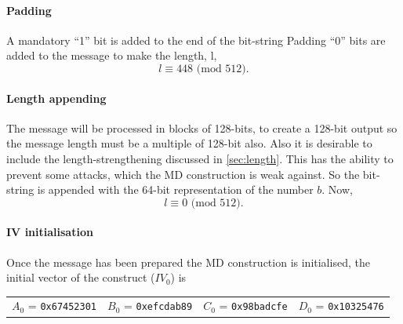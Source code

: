 \documentclass[a4paper,12pt]{article}
\begin{document}
\paragraph{Padding}
\label{sec:md5pad}
A mandatory ``1'' bit is added to the end of the bit-string 
Padding ``0'' bits are added to the message to make the length, l, $$l \equiv 448 \text{ (mod } 512).$$

\paragraph{Length appending}
The message will be processed in blocks of 128-bits, to create a 128-bit output so the message length must be a multiple of 128-bit also. Also it is desirable to include the length-strengthening discussed in \ref{sec:length}. This has the ability to prevent some attacks, which the MD construction is weak against. So the bit-string is appended with the 64-bit representation of the number $b$. Now, $$l \equiv 0 \text{ (mod } 512).$$

\paragraph{IV initialisation}
Once the message has been prepared the MD construction is initialised, the initial vector of the construct ($IV_0$) is

\begin{tabular}{ l l l l}
	$A_0$ = \texttt{0x67452301}& $B_0$ = \texttt{0xefcdab89}& $C_0$ = \texttt{0x98badcfe}& $D_0$ = \texttt{0x10325476}
\end{tabular}
\end{document}
